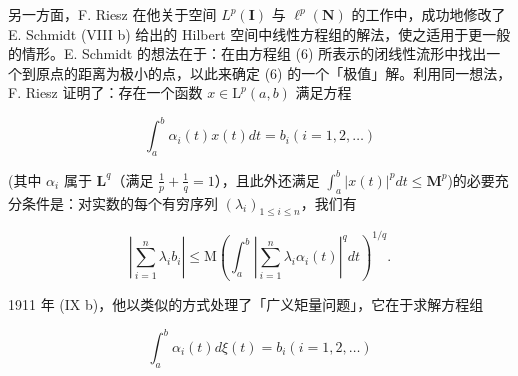 另一方面，F. Riesz 在他关于空间 \(L^{p}(\mathbf{I})\) 与 \(\ell^{p}(\mathbf{N})\) 的工作中，成功地修改了 E. Schmidt (VIII b) 给出的 Hilbert 空间中线性方程组的解法，使之适用于更一般的情形。E. Schmidt 的想法在于：在由方程组 (6) 所表示的闭线性流形中找出一个到原点的距离为极小的点，以此来确定 (6) 的一个「极值」解。利用同一想法，F. Riesz 证明了：存在一个函数 \(x \in \mathrm{L}^{p}(a, b)\) 满足方程

\[
\int_ {a} ^ {b} \alpha_ {i} (t) x (t) d t = b _ {i} (i = 1, 2, \dots)\tag{9}
\]

(其中 \(\alpha_{i}\) 属于 \(\mathbf{L}^q\)（满足 \(\frac{1}{p} +\frac{1}{q} = 1\)），且此外还满足 \(\int_{a}^{b}|x(t)|^{p}dt\leqslant \mathbf{M}^{p}\))的必要充分条件是：对实数的每个有穷序列 \((\lambda_i)_{1\leqslant i\leqslant n}\)，我们有

\[
\left| \sum_ {i = 1} ^ {n} \lambda_ {i} b _ {i} \right| \leqslant \mathrm{M} \left(\int_ {a} ^ {b} \left| \sum_ {i = 1} ^ {n} \lambda_ {i} \alpha_ {i} (t) \right| ^ {q} d t\right) ^ {1 / q}.\tag{10}
\]

1911 年 (IX b)，他以类似的方式处理了「广义矩量问题」，它在于求解方程组

\[
\int_ {a} ^ {b} \alpha_ {i} (t) d \xi (t) = b _ {i} (i = 1, 2, \dots)\tag{11}
\]

